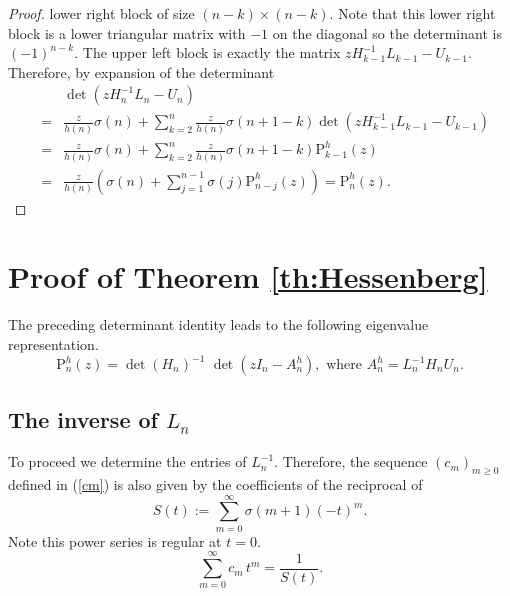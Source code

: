 \documentclass[11pt,reqno]{amsart}
\theoremstyle{plain}
\theoremstyle{remark}
\theoremstyle{definition}
\numberwithin{equation}{section}
\newcommand{\pol}{\mathrm{P}}
\begin{document}
\begin{proof}
lower right block of size $\left( n-k\right) \times \left( n-k\right) $.
Note that this lower right
block is a lower triangular matrix with $-1$ on the
diagonal so the determinant is $\left( -1\right) ^{n-k}$. The upper left
block is exactly the matrix $zH_{k-1}^{-1}L_{k-1}-U_{k-1}$. Therefore, by
expansion of the determinant
\begin{eqnarray*}
&&\det \left( zH_{n}^{-1}L_{n}-U_{n}\right) \\
&=&%
\frac{z}{h\left( n\right)
}\sigma \left( n\right)
+\sum _{k=2}^{n}
\frac{z}{h\left( n\right)
}\sigma \left(
n+1-k\right) \det \left( zH_{k-1}^{-1}L_{k-1}-U_{k-1}\right) 
\\
&=&\frac{z}{h\left( n\right)
}\sigma \left( n\right) +\sum _{k=2}^{n}\frac{z}{h\left(
n\right)
}\sigma \left( n+1-k\right) \pol _{k-1}^{h}\left( z\right) \\
&=&\frac{z}{h\left( n\right) }\left( \sigma \left( n\right) +\sum _{j
=1}^{n-1}\sigma \left( j
\right) \pol _{n-j
}^{h}\left( z\right) \right)
=
\pol _{n}^{h}\left( z\right) .
\end{eqnarray*}
\end{proof}



\section{\label{a:hessbew}Proof of Theorem \ref{th:Hessenberg}}
The preceding determinant identity leads to the following eigenvalue representation.
\begin{equation}
\pol _n^h(z)=\det\left(H_n\right)^{-1}  \,\,\det \left(z I_n - A_n^h \right), \text{ where } A_n^h = L_n^{-1} H_n U_n.  \label{det:formula}
\end{equation}
\subsection{The inverse of $L_n$}
To proceed we determine the entries of $L_n^{-1}$. Therefore, the sequence $\left(
c_m\right)
_{m \geq 0}$ defined in (\ref{cm}) is also given by the coefficients
of the reciprocal of $$S\left( t\right) :=\sum _{m
=0}^{\infty }\sigma \left( m +1 \right) \left( -t\right) ^{m}.$$
Note this power series is regular at $t=0$.
\begin{equation*}
\sum_{m=0}^{\infty} c_m \, t^m = \frac{1}{S(t)}.
\end{equation*}
\end{document}
